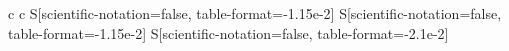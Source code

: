 \documentclass[11pt,dvipsnames]{thesis}
\begin{document}
\begin{table}[H]
{\begin{tabular}{c c S[scientific-notation=false, table-format=-1.15e-2] S[scientific-notation=false, table-format=-1.15e-2] S[scientific-notation=false, table-format=-2.1e-2]}

\end{tabular}}
\end{table}
\end{document}
